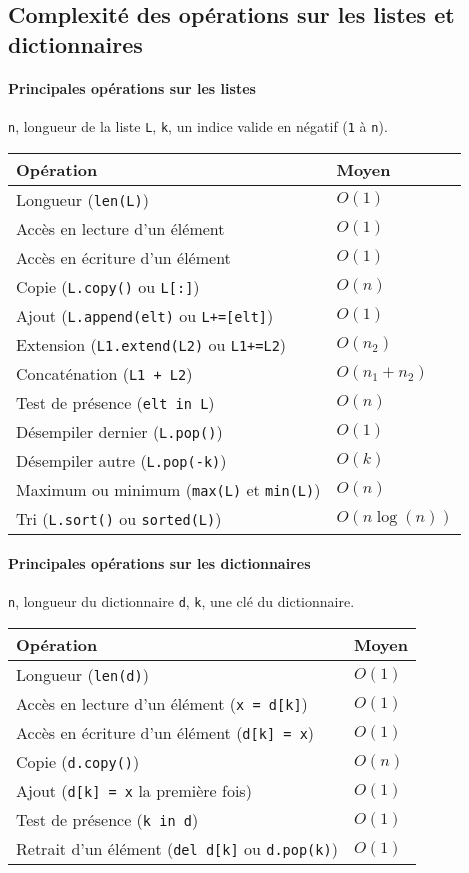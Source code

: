 \subsection*{Complexité des opérations sur les listes et dictionnaires}

\paragraph*{Principales opérations sur les listes}

\texttt{n}, longueur de la liste \texttt{L}, \texttt{k}, un indice valide en négatif (\texttt{1} à \texttt{n}).

\begin{longtable}{|m{9cm}|m{2.1cm}|} \hline
	\bf \centering Opération & \bf \centering Moyen \tabularnewline
	\hline
	\endhead
	Longueur (\texttt{len(L)}) &  $O(1)$ \tabularnewline
	\hline
	Accès en lecture d'un élément &  $O(1)$ \tabularnewline
	\hline
	Accès en écriture d'un élément &  $O(1)$ \tabularnewline
	\hline
	Copie (\texttt{L.copy()} ou \texttt{L[:]}) & $O(n)$ \tabularnewline
	\hline
	Ajout (\texttt{L.append(elt)} ou \texttt{L+=[elt]}) & $O(1)$ \tabularnewline
	\hline
	Extension (\texttt{L1.extend(L2)} ou \texttt{L1+=L2}) & $O(n_2)$ \tabularnewline
	\hline
	Concaténation (\texttt{L1 + L2}) &  $O(n_1 + n_2)$ \tabularnewline
	\hline
	Test de présence (\texttt{elt in L}) & $O(n)$ \tabularnewline
	\hline
	Désempiler dernier (\texttt{L.pop()}) &  $O(1)$ \tabularnewline
	\hline
	Désempiler autre (\texttt{L.pop(-k)}) &  $O(k)$ \tabularnewline
	\hline
	Maximum ou minimum (\texttt{max(L)} et \texttt{min(L)}) &  $O(n)$ \tabularnewline
	\hline
	Tri (\texttt{L.sort()} ou \texttt{sorted(L)}) &  $O(n \log(n))$ \tabularnewline
	\hline
\end{longtable}

\paragraph*{Principales opérations sur les dictionnaires}

\texttt{n}, longueur du dictionnaire \texttt{d}, \texttt{k}, une clé du dictionnaire.

\begin{longtable}{|m{9cm}|m{2.1cm}|} \hline
	\bf \centering Opération & \bf \centering Moyen \tabularnewline
	\hline
	\endhead
	Longueur (\texttt{len(d)}) &  $O(1)$ \tabularnewline
	\hline
	Accès en lecture d'un élément (\texttt{x = d[k]})  &  $O(1)$ \tabularnewline
	\hline
	Accès en écriture d'un élément (\texttt{d[k] = x}) &  $O(1)$ \tabularnewline
	\hline
	Copie (\texttt{d.copy()}) & $O(n)$ \tabularnewline
	\hline
	Ajout (\texttt{d[k] = x} la première fois) & $O(1)$ \tabularnewline
	\hline
	Test de présence (\texttt{k in d}) & $O(1)$ \tabularnewline
	\hline
	Retrait d'un élément (\texttt{del d[k]} ou \texttt{d.pop(k)}) & $O(1)$ \tabularnewline
	\hline
\end{longtable}

